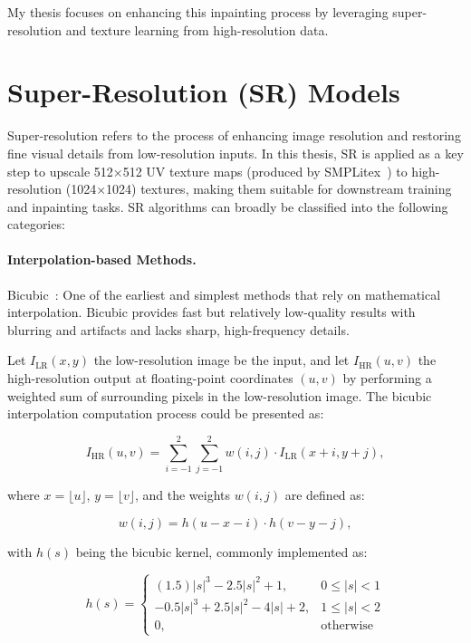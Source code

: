 My thesis focuses on enhancing this inpainting process by leveraging super-resolution and texture learning from high-resolution data.

\section{Super-Resolution (SR) Models}

Super-resolution refers to the process of enhancing image resolution and restoring fine visual details from low-resolution inputs. In this thesis, SR is applied as a key step to upscale 512×512 UV texture maps (produced by SMPLitex~\cite{casas2023smplitex}) to high-resolution (1024×1024) textures, making them suitable for downstream training and inpainting tasks. SR algorithms can broadly be classified into the following categories:

\paragraph{Interpolation-based Methods.}
Bicubic~\cite{1163711}: One of the earliest and simplest methods that rely on mathematical interpolation. Bicubic provides fast but relatively low-quality results with blurring and artifacts and lacks sharp, high-frequency details.

Let \( I_{\text{LR}}(x, y) \) the low-resolution image be the input, and let \( I_{\text{HR}}(u, v) \) the high-resolution output at floating-point coordinates \( (u, v) \) by performing a weighted sum of surrounding pixels in the low-resolution image. The bicubic interpolation computation process could be presented as:

\begin{equation}
I_{\text{HR}}(u, v) = \sum_{i=-1}^{2} \sum_{j=-1}^{2} w(i,j) \cdot I_{\text{LR}}(x+i, y+j),
\end{equation}

where \( x = \lfloor u \rfloor \), \( y = \lfloor v \rfloor \), and the weights \( w(i,j) \) are defined as:

\begin{equation}
w(i,j) = h(u - x - i) \cdot h(v - y - j),
\end{equation}

with \( h(s) \) being the bicubic kernel, commonly implemented as:

\begin{equation}
h(s) = 
\begin{cases}
(1.5)|s|^3 - 2.5|s|^2 + 1, & 0 \leq |s| < 1 \\
-0.5|s|^3 + 2.5|s|^2 - 4|s| + 2, & 1 \leq |s| < 2 \\
0, & \text{otherwise}
\end{cases}
\end{equation}

